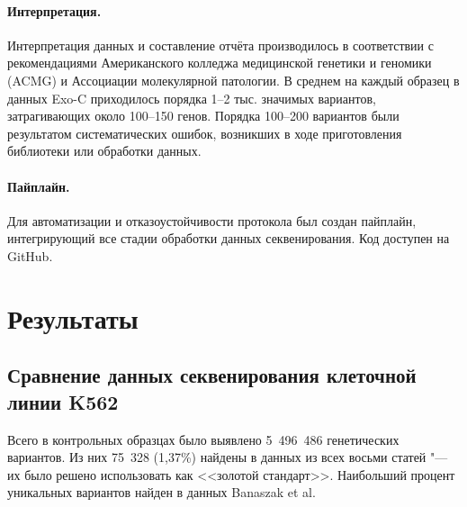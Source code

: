 \documentclass[a4paper,12pt]{article}
\begin{document}
\paragraph{Интерпретация.}
Интерпретация данных и составление отчёта производилось в соответствии с рекомендациями Американского колледжа медицинской генетики и геномики (ACMG) и Ассоциации молекулярной патологии\cite{richards}.
В среднем на каждый образец в данных Exo-C приходилось порядка 1--2 тыс. значимых вариантов, затрагивающих около 100--150 генов.
Порядка 100--200 вариантов были результатом систематических ошибок, возникших в ходе приготовления библиотеки или обработки данных.

\paragraph{Пайплайн.}
Для автоматизации и отказоустойчивости протокола был создан пайплайн, интегрирующий все стадии обработки данных секвенирования.
Код доступен на GitHub.

\section{Результаты}

\subsection{Сравнение данных секвенирования клеточной линии K562}

Всего в контрольных образцах было выявлено 5~496~486 генетических вариантов.
Из них 75~328 (1,37\%) найдены в данных из всех восьми статей "--- их было решено использовать как <<золотой стандарт>>.
Наибольший процент уникальных вариантов найден в данных Banaszak et al.
\end{document}
